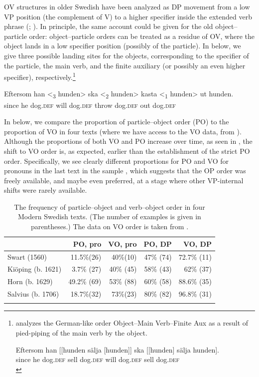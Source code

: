 \documentclass[output=paper]{langscibook}
\begin{document}
OV structures in older Swedish have been analyzed as DP movement from a low VP position (the complement of V) to a higher specifier inside the extended verb phrase (\citealt{Delsing1999}; \citealt{Petzell2011, Petzell2012}). In principle, the same account could be given for the old object–particle order: object–particle orders can be treated as a residue of OV, where the object lands in a low specifier position (possibly of the particle). In  below, we give three possible landing sites for the objects, corresponding to the specifier of the particle, the main verb, and the finite auxiliary (or possibly an even higher specifier), respectively.\footnote{\citet{Petzell2012} analyzes the German-like order Object–Main Verb–Finite Aux as a result of pied-piping of the main verb by the object.

    \ea
    \gll  Eftersom    han [[hunden   sälja [hunden]]   ska [[hunden]   sälja   hunden].\\
    since   he     dog.\textsc{def}   sell       dog.\textsc{def}     will   dog.\textsc{def}     sell   dog.\textsc{def}\\
    \z}


\ea\label{ex:lalu:46}
\gll Eftersom  han <\textsubscript{3} hunden>   ska   <\textsubscript{2} hunden> kasta     <\textsubscript{1} hunden>   ut     hunden.\\
since        he      dog\textsc{.def}  will     dog\textsc{.def}  throw        dog\textsc{.def}   out   dog\textsc{.def}  \\
\z


In  below, we compare the proportion of particle–object order (PO) to the proportion of VO in four texts (where we have access to the VO data, from \citealt{Petzell2012}). Although the proportions of both VO and PO increase over time, as seen in , the shift to VO order is, as expected, earlier than the establishment of the strict PO order. Specifically, we see clearly different proportions for PO and VO for pronouns in the last text in the sample \citep{Salvius1706}, which suggests that the OP order was freely available, and maybe even preferred, at a stage where other VP-internal shifts were rarely available.


\begin{table}
\caption{The frequency of particle–object and verb–object order in four Modern Swedish texts. (The number of examples is given in parentheses.) The data on VO order is taken from \citet{Petzell2012}.}
\label{tab:lalu:3}
\begin{tabularx}{0.85\textwidth}{Xrrrr}
\lsptoprule
& PO, pro & VO, pro & PO, DP & VO, DP\\
\midrule
Swart (1560) & 11.5\%(26) & 40\%(10) & 47\% (74) & 72.7\% (11)\\
Kiöping (b. 1621) & 3.7\% (27) & 40\% (45) & 58\% (43) & 62\%   (37)\\
Horn (b. 1629) & 49.2\%   (69) & 53\%   (88) & 60\% (58) & 88.6\% (35)\\
Salvius (b. 1706) & 18.7\%(32) & 73\%(23) & 80\% (82) & 96.8\% (31)\\
\lspbottomrule
\end{tabularx}
\end{table}
\end{document}
